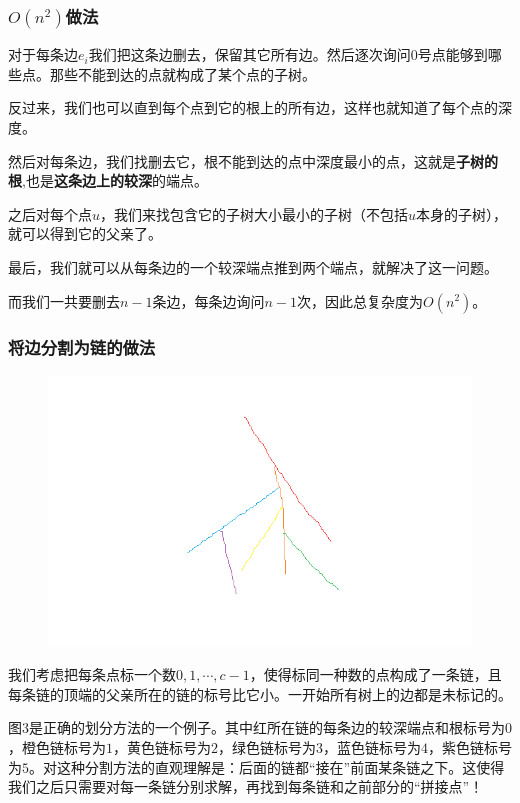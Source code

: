 \documentclass{noithesis}
\begin{document}
\subsubsection{$O(n^2)$做法}

对于每条边$e_i$我们把这条边删去，保留其它所有边。然后逐次询问$0$号点能够到哪些点。那些不能到达的点就构成了某个点的子树。

反过来，我们也可以直到每个点到它的根上的所有边，这样也就知道了每个点的深度。

然后对每条边，我们找删去它，根不能到达的点中深度最小的点，这就是\textbf{子树的根},也是\textbf{这条边上的较深}的端点。

之后对每个点$u$，我们来找包含它的子树大小最小的子树（不包括$u$本身的子树），就可以得到它的父亲了。

最后，我们就可以从每条边的一个较深端点推到两个端点，就解决了这一问题。

而我们一共要删去$n - 1$条边，每条边询问$n - 1$次，因此总复杂度为$O(n^2)$。


\subsubsection{将边分割为链的做法}

\newpage

\begin{figure}
\centering
\includegraphics[scale=0.45]{graph5.png}
\caption{}     \label{fig:ss}
\end{figure}

我们考虑把每条点标一个数$0, 1, \cdots, c - 1$，使得标同一种数的点构成了一条链，且每条链的顶端的父亲所在的链的标号比它小。一开始所有树上的边都是未标记的。

图$3$是正确的划分方法的一个例子。其中红所在链的每条边的较深端点和根标号为$0$，橙色链标号为$1$，黄色链标号为$2$，绿色链标号为$3$，蓝色链标号为$4$，紫色链标号为$5$。对这种分割方法的直观理解是：后面的链都“接在”前面某条链之下。这使得我们之后只需要对每一条链分别求解，再找到每条链和之前部分的“拼接点”！
\end{document}

